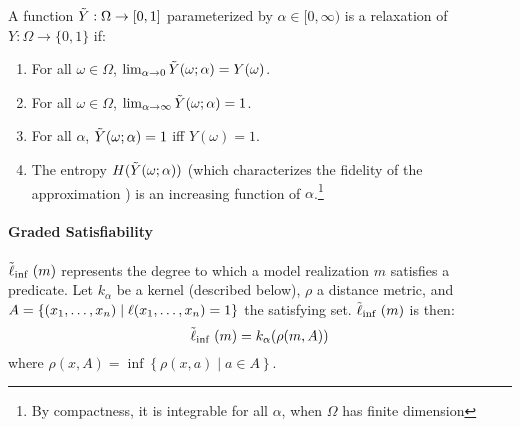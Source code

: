 

\begin{definition}
A function $\tilde{Y} : \Omega \to [0, 1]$ parameterized by $\alpha \in [0, \infty)$ is a relaxation of $Y: \Omega \to \{0, 1\}$ if:
\begin{enumerate}[label=(\roman*)]
	\label{def:temp}
	\item For all $\omega \in \Omega$, $\lim_{\alpha \to 0}\tilde{Y}(\omega; \alpha) = Y(\omega)$.
	\item For all $\omega \in \Omega$, $\lim_{\alpha \to \infty}\tilde{Y}(\omega; \alpha) = 1$.

    \item For all $\alpha$, $\tilde{Y}(\omega; \alpha) = 1$ iff $Y(\omega) = 1$.
    \item The entropy $H(\tilde{Y}(\omega; \alpha))$ (which characterizes the fidelity of the approximation ) is an increasing function of $\alpha$.\footnote
    {By compactness, it is integrable for all $\alpha$, when $\Omega$ has finite dimension}
\end{enumerate}
\end{definition}

\paragraph{Graded Satisfiability}
$\mathrel{\tilde{\operatorname{\ell}}}_{\inf}(m)$ represents the degree to which a model realization $m$ satisfies a predicate.
Let $k_\alpha$ be a kernel (described below), $\rho$ a distance metric, and $A = \{(x_1, \dots, x_n) \mid \operatorname{\ell}(x_1, \dots, x_n) = 1\}$ the satisfying set.
$\mathrel{\tilde{\operatorname{\ell}}}_{\inf}(m)$ is then:
\begin{equation}
\mathrel{\tilde{\operatorname{\ell}}}_{\inf}(m) = k_\alpha(\rho(m, A))
\end{equation}
where $\rho(x, A) = \inf \left\{\rho(x, a) \mid a \in A\right\}$.

